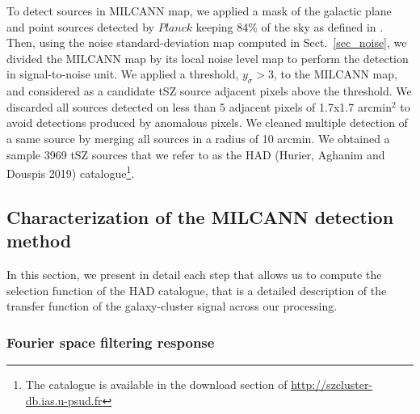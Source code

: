 \documentclass[traditabstract,a4,twocolumn]{aa}
\begin{document}
To detect sources in MILCANN map, we applied a mask of the
galactic plane and point sources detected by $Planck$ keeping 84\% of
the sky as defined in \citet{planckPSZ}. Then, using the noise standard-deviation map computed in Sect.~\ref{sec_noise}, we divided the
MILCANN map by its local noise level map to perform the detection in signal-to-noise unit.
We applied a
threshold, $y_\sigma > 3$, to the MILCANN map, and considered as a candidate tSZ source adjacent pixels above the threshold. We discarded all sources detected on less than 5 adjacent pixels of 1.7x1.7
arcmin$^2$ to avoid detections produced by anomalous pixels. We cleaned
multiple detection of a same source by merging all sources in a
radius of 10 arcmin. We obtained a sample 3969 tSZ sources that we refer to as the HAD (Hurier, Aghanim and Douspis 2019) catalogue\footnote{The catalogue is available in the download section of \url{http://szcluster-db.ias.u-psud.fr}}.

\subsection{Characterization of the MILCANN detection method}

In this section, we present in
detail each step that allows us to compute the selection function of the HAD catalogue, that is a detailed description
of the transfer function of the galaxy-cluster signal across our processing.

\subsubsection{Fourier space filtering response}
\end{document}
